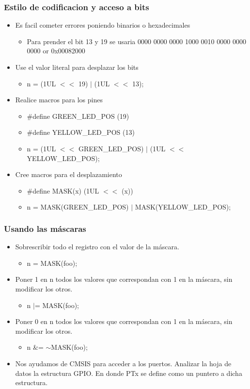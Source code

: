 \documentclass[10.5pt,scale=1.0,t,aspectratio=169,hyperref={pdfpagelabels=false}]{beamer}
\begin{document}
\begin{frame}
	\frametitle{Estilo de codificacion y acceso a bits}
	\begin{itemize}
		\item Es facil cometer errores poniendo binarios o hexadecimales
		\begin{itemize}
			\item Para prender el bit 13 y 19 se usaria 0000 0000 0000 1000 0010 0000 0000 0000 or 0x00082000 
		\end{itemize}
		\item Use el valor literal para desplazar los bits
		\begin{itemize}
			\item[] n = (1UL $<<$ 19) $\mid$ (1UL $<<$ 13);
		\end{itemize}
		\item Realice macros para los pines
		\begin{itemize}
			\item[] \#define GREEN\_LED\_POS (19)
			\item[]	\#define YELLOW\_LED\_POS (13)
			\item[] n = (1UL $<<$ GREEN\_LED\_POS) $\mid$ (1UL $<<$ YELLOW\_LED\_POS);
		\end{itemize}
		\item Cree macros para el desplazamiento
		\begin{itemize}
			\item[] \#define MASK(x) (1UL $<<$ (x))
			\item[]	n = MASK(GREEN\_LED\_POS) $\mid$ MASK(YELLOW\_LED\_POS);
		\end{itemize}
	\end{itemize}
\end{frame}
\begin{frame}
	\frametitle{Usando las máscaras}
	\begin{itemize}
		\item Sobrescribir todo el registro con el valor de la máscara. 
		\begin{itemize}
			\item[] n = MASK(foo);
		\end{itemize}
		\item Poner 1 en n todos los valores que correspondan con 1 en la máscara, sin modificar los otros. 
		\begin{itemize}
			\item[] n $\mid$= MASK(foo);
		\end{itemize}
		\item Poner 0 en n todos los valores que correspondan con 1 en la máscara, sin modificar los otros. 
		\begin{itemize}
			\item[] n \&= $\sim$MASK(foo);
		\end{itemize}
		\item Nos ayudamos de CMSIS para acceder a los puertos. Analizar la hoja de datos la estructura GPIO. En donde PTx se define como un puntero a dicha estructura. 
	\end{itemize}
\end{frame}
\end{document}
